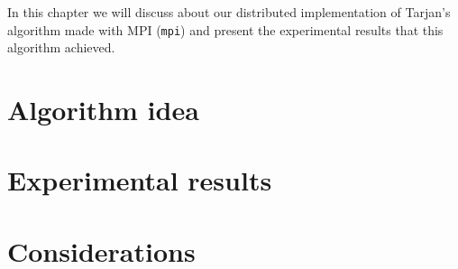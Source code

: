 \label{ch:2}
In this chapter we will discuss about our distributed implementation of Tarjan's algorithm made with MPI (\verb|mpi|) and present the experimental results that this algorithm achieved.
\section{Algorithm idea}


\section{Experimental results}


\section{Considerations}

